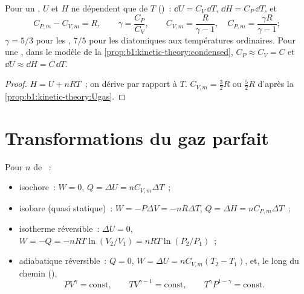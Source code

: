 \begin{proposition}\label{prop:b1:first-law:gas}
Pour un , $U$ et $H$ ne dépendent que de $T$ ()~:
$\dd U = C_V\,\dd T$, $\dd H = C_P\,\dd T$, et
\[
C_{P,m} - C_{V,m} = R, \qquad \gamma = \frac{C_P}{C_V}, \qquad
C_{V,m} = \frac{R}{\gamma - 1}, \quad C_{P,m} = \frac{\gamma R}{\gamma - 1} ;
\]
$\gamma = 5/3$ pour les , $7/5$ pour les diatomiques aux
températures ordinaires. Pour une , dans le modèle de la
\cref{prop:b1:kinetic-theory:condensed}, $C_P \approx C_V = C$ et
$\dd U \approx \dd H = C\,\dd T$.
\end{proposition}

\begin{proof}
$H = U + nRT$~; on dérive par rapport à $T$. $C_{V,m} = \tfrac32 R$ ou
$\tfrac52 R$ d'après la \cref{prop:b1:kinetic-theory:Ugas}.
\end{proof}

\section{Transformations du gaz parfait}

\begin{proposition}\label{prop:b1:first-law:transformations}
Pour $n$  de ~:
\begin{itemize}
  \item isochore~: $W = 0$, $Q = \Delta U = nC_{V,m}\Delta T$~;
  \item isobare (quasi statique)~: $W = -P\Delta V = -nR\Delta T$, $Q = \Delta H =
        nC_{P,m}\Delta T$~;
  \item isotherme réversible~: $\Delta U = 0$, $W = -Q = -nRT\ln(V_2/V_1) =
        nRT\ln(P_2/P_1)$~;
  \item adiabatique réversible~: $Q = 0$, $W = \Delta U = nC_{V,m}(T_2 - T_1)$,
        et, le long du chemin (\emph{}),
        \[
        PV^\gamma = \text{const}, \qquad TV^{\gamma - 1} = \text{const}, \qquad
        T^\gamma P^{1 - \gamma} = \text{const} .
        \]
\end{itemize}
\end{proposition}

